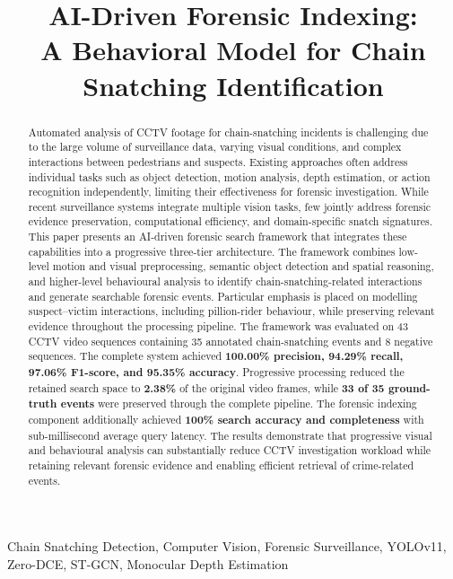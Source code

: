 \documentclass[conference]{IEEEtran}
\title{AI-Driven Forensic Indexing:\\
A Behavioral Model for Chain Snatching Identification}
\author{
\IEEEauthorblockN{Anonymous}
}
\begin{document}

\maketitle

\begin{abstract}
Automated analysis of CCTV footage for chain-snatching incidents is
challenging due to the large volume of surveillance data, varying
visual conditions, and complex interactions between pedestrians and suspects. Existing approaches often address individual
tasks such as object detection, motion analysis, depth estimation, or
action recognition independently, limiting their effectiveness for
forensic investigation. While recent surveillance systems integrate multiple vision tasks, few jointly address forensic evidence preservation, computational efficiency, and domain-specific snatch signatures. This paper presents an AI-driven forensic
search framework that integrates these capabilities into a progressive
three-tier architecture. The framework combines low-level motion and
visual preprocessing, semantic object detection and spatial reasoning,
and higher-level behavioural analysis to identify chain-snatching-related
interactions and generate searchable forensic events. Particular
emphasis is placed on modelling suspect--victim interactions,
including pillion-rider behaviour, while preserving relevant evidence
throughout the processing pipeline. The framework was evaluated on
43 CCTV video sequences containing 35 annotated chain-snatching events
and 8 negative sequences. The complete system achieved
\textbf{100.00\% precision, 94.29\% recall, 97.06\% F1-score, and
95.35\% accuracy}. Progressive processing reduced the retained search
space to \textbf{2.38\%} of the original video frames, while
\textbf{33 of 35 ground-truth events} were preserved through the
complete pipeline. The forensic indexing component additionally
achieved \textbf{100\% search accuracy and completeness} with
sub-millisecond average query latency. The results demonstrate that
progressive visual and behavioural analysis can substantially reduce
CCTV investigation workload while retaining relevant forensic evidence
and enabling efficient retrieval of crime-related events.
\end{abstract}

\begin{IEEEkeywords}
Chain Snatching Detection, Computer Vision, Forensic Surveillance,
YOLOv11, Zero-DCE, ST-GCN, Monocular Depth Estimation
\end{IEEEkeywords}
\end{document}
